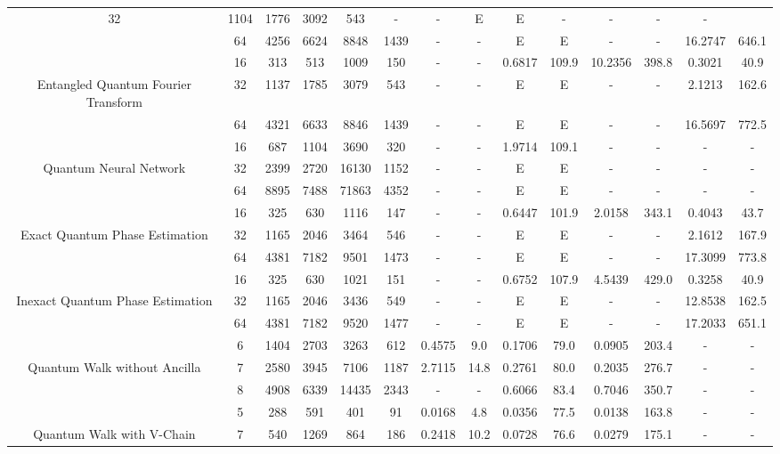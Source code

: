 \begin{table}[htb]
{\begin{tabular}{|c|c|c|c|c|c|c|c|c|c|c|c|c|c|}
32 & 1104 & 1776 & 3092 & 543
 & - & -
 & E & E
 & - & -
 & - & -
 \\
 & 
64 & 4256 & 6624 & 8848 & 1439
 & - & -
 & E & E
 & - & -
 & 16.2747 & 646.1
 \\
\hline
 & 
16 & 313 & 513 & 1009 & 150
 & - & -
 & 0.6817 & 109.9
 & 10.2356 & 398.8
 & 0.3021 & 40.9
 \\
Entangled Quantum Fourier Transform & 
32 & 1137 & 1785 & 3079 & 543
 & - & -
 & E & E
 & - & -
 & 2.1213 & 162.6
 \\
 & 
64 & 4321 & 6633 & 8846 & 1439
 & - & -
 & E & E
 & - & -
 & 16.5697 & 772.5
 \\
\hline
 & 
16 & 687 & 1104 & 3690 & 320
 & - & -
 & 1.9714 & 109.1
 & - & -
 & - & -
 \\
Quantum Neural Network & 
32 & 2399 & 2720 & 16130 & 1152
 & - & -
 & E & E
 & - & -
 & - & -
 \\
 & 
64 & 8895 & 7488 & 71863 & 4352
 & - & -
 & E & E
 & - & -
 & - & -
 \\
\hline
 & 
16 & 325 & 630 & 1116 & 147
 & - & -
 & 0.6447 & 101.9
 & 2.0158 & 343.1
 & 0.4043 & 43.7
 \\
Exact Quantum Phase Estimation & 
32 & 1165 & 2046 & 3464 & 546
 & - & -
 & E & E
 & - & -
 & 2.1612 & 167.9
 \\
 & 
64 & 4381 & 7182 & 9501 & 1473
 & - & -
 & E & E
 & - & -
 & 17.3099 & 773.8
 \\
\hline
 & 
16 & 325 & 630 & 1021 & 151
 & - & -
 & 0.6752 & 107.9
 & 4.5439 & 429.0
 & 0.3258 & 40.9
 \\
Inexact Quantum Phase Estimation & 
32 & 1165 & 2046 & 3436 & 549
 & - & -
 & E & E
 & - & -
 & 12.8538 & 162.5
 \\
 & 
64 & 4381 & 7182 & 9520 & 1477
 & - & -
 & E & E
 & - & -
 & 17.2033 & 651.1
 \\
\hline
 & 
6 & 1404 & 2703 & 3263 & 612
 & 0.4575 & 9.0
 & 0.1706 & 79.0
 & 0.0905 & 203.4
 & - & -
 \\
Quantum Walk without Ancilla & 
7 & 2580 & 3945 & 7106 & 1187
 & 2.7115 & 14.8
 & 0.2761 & 80.0
 & 0.2035 & 276.7
 & - & -
 \\
 & 
8 & 4908 & 6339 & 14435 & 2343
 & - & -
 & 0.6066 & 83.4
 & 0.7046 & 350.7
 & - & -
 \\
\hline
 & 
5 & 288 & 591 & 401 & 91
 & 0.0168 & 4.8
 & 0.0356 & 77.5
 & 0.0138 & 163.8
 & - & -
 \\
Quantum Walk with V-Chain & 
7 & 540 & 1269 & 864 & 186
 & 0.2418 & 10.2
 & 0.0728 & 76.6
 & 0.0279 & 175.1
 & - & -
 \\

\end{tabular}}
\end{table}
